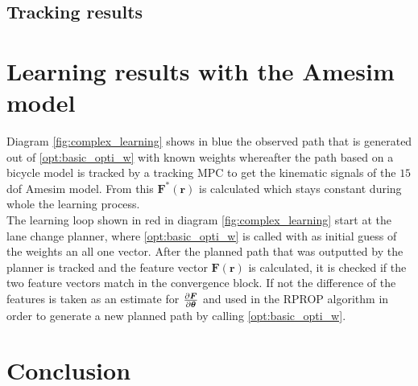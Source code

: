\subsection{Tracking results}













\section{Learning results with the Amesim model}
\label{s:complex_learning_results}

Diagram \ref{fig:complex_learning} shows in blue the observed path that is generated out of \ref{opt:basic_opti_w} with known weights whereafter the path based on a bicycle model is tracked by a tracking MPC to get the kinematic signals of the $15$ dof Amesim model. From this $\bm{F}^*(\bm{r})$ is calculated which stays constant during whole the learning process.\\

The learning loop shown in red in diagram \ref{fig:complex_learning} start at the lane change planner, where \ref{opt:basic_opti_w} is called with as initial guess of the weights an all one vector. After the planned path that was outputted by the planner is tracked and the feature vector $\bm{F}(\bm{r})$ is calculated, it is checked if the two feature vectors match in the convergence block. If not the difference of the features is taken as an estimate for $\pdv{\bm{F}}{\bm{\theta}}$ and used in the RPROP algorithm in order to generate a new planned path by calling \ref{opt:basic_opti_w}.


\section{Conclusion}


